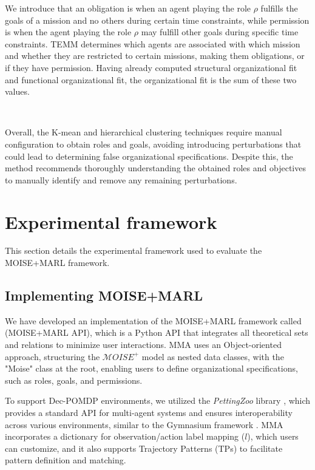 \documentclass[sigconf,anonymous]{aamas}
\begin{document}
We introduce that an obligation is when an agent playing the role $\rho$ fulfills the goals of a mission and no others during certain time constraints, while permission is when the agent playing the role $\rho$ may fulfill other goals during specific time constraints.
TEMM determines which agents are associated with which mission and whether they are restricted to certain missions, making them obligations, or if they have permission.
Having already computed structural organizational fit and functional organizational fit, the organizational fit is the sum of these two values.

\

Overall, the K-mean and hierarchical clustering techniques require manual configuration to obtain roles and goals, avoiding introducing perturbations that could lead to determining false organizational specifications. Despite this, the method recommends thoroughly understanding the obtained roles and objectives to manually identify and remove any remaining perturbations.

\section{Experimental framework}
\label{sec:experimental_setup}

This section details the experimental framework used to evaluate the MOISE+MARL framework.%

\subsection{Implementing MOISE+MARL}

We have developed an implementation of the MOISE+MARL framework called ~\hyperref[fn:github]{\footnotemark[1]} (MOISE+MARL API), which is a Python API that integrates all theoretical sets and relations to minimize user interactions. MMA uses an Object-oriented approach, structuring the $\mathcal{M}OISE^+$ model as nested data classes, with the "Moise" class at the root, enabling users to define organizational specifications, such as roles, goals, and permissions.

To support Dec-POMDP environments, we utilized the \textit{PettingZoo} library \cite{terry2020pettingzoo}, which provides a standard API for multi-agent systems and ensures interoperability across various environments, similar to the Gymnasium framework \cite{kwiatkowski2024}. MMA incorporates a dictionary for observation/action label mapping ($l$), which users can customize, and it also supports Trajectory Patterns (TPs) to facilitate pattern definition and matching.
\end{document}
